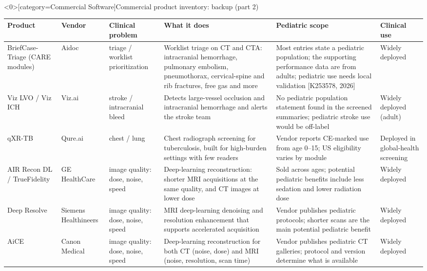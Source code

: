 \documentclass[aspectratio=169]{beamer}
\renewcommand{\arraystretch}{1.08}
\begin{document}
\begin{frame}<0>[category=Commercial Software]{Commercial product inventory: backup (part 2)}
\tiny
\begin{adjustbox}{max totalsize={\textwidth}{0.68\textheight}}
\renewcommand{\arraystretch}{1.2}
\begin{tabular}{|>{\raggedright\arraybackslash}p{}|>{\raggedright\arraybackslash}p{}|>{\raggedright\arraybackslash}p{}|>{\raggedright\arraybackslash}p{}|>{\raggedright\arraybackslash}p{}|>{\raggedright\arraybackslash}p{}|}
\hline \textbf{Product} & \textbf{Vendor} & \textbf{Clinical problem} & \textbf{What it does} & \textbf{Pediatric scope} & \textbf{Clinical use} \\ \hline
BriefCase-Triage (CARE modules) & Aidoc & triage / worklist prioritization & Worklist triage on CT and CTA: intracranial hemorrhage, pulmonary embolism, pneumothorax, cervical-spine and rib fractures, free gas and more & Most entries state a pediatric population; the supporting performance data are from adults; pediatric use needs local validation [K253578, 2026] & Widely deployed \\ \hline
Viz LVO / Viz ICH & Viz.ai & stroke / intracranial bleed & Detects large-vessel occlusion and intracranial hemorrhage and alerts the stroke team & No pediatric population statement found in the screened summaries; pediatric stroke use would be off-label & Widely deployed (adult) \\ \hline
qXR-TB & Qure.ai & chest / lung & Chest radiograph screening for tuberculosis, built for high-burden settings with few readers & Vendor reports CE-marked use from age 0--15; US eligibility varies by module & Deployed in global-health screening \\ \hline
AIR Recon DL / TrueFidelity & GE HealthCare & image quality: dose, noise, speed & Deep-learning reconstruction: shorter MRI acquisitions at the same quality, and CT images at lower dose & Sold across ages; potential pediatric benefits include less sedation and lower radiation dose & Widely deployed \\ \hline
Deep Resolve & Siemens Healthineers & image quality: dose, noise, speed & MRI deep-learning denoising and resolution enhancement that supports accelerated acquisition & Vendor publishes pediatric protocols; shorter scans are the main potential pediatric benefit & Widely deployed \\ \hline
AiCE & Canon Medical & image quality: dose, noise, speed & Deep-learning reconstruction for both CT (noise, dose) and MRI (noise, resolution, scan time) & Vendor publishes pediatric CT galleries; protocol and version determine what is available & Widely deployed \\ \hline

\end{tabular}
\end{adjustbox}
\end{frame}
\end{document}

